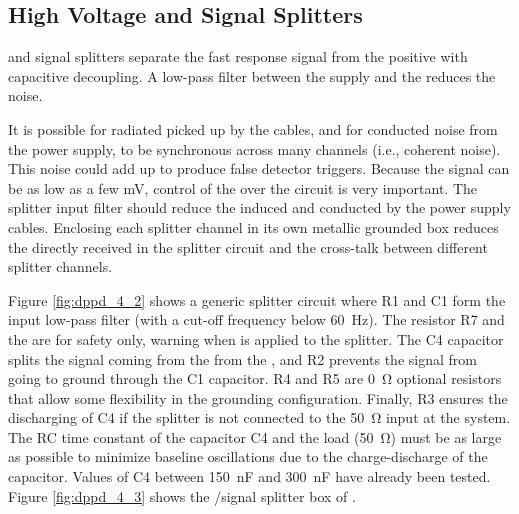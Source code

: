 
\subsection{High Voltage and Signal Splitters}
\label{sec:fddp-pd-4.2}

 and signal splitters 
separate the fast  response signal from the positive  with capacitive decoupling. 
A low-pass filter between the  supply and the  reduces the noise.

It is possible for radiated  picked up by the cables, and for conducted noise from the  power supply, to be synchronous across many  channels (i.e., coherent noise). This noise could add up to produce false detector triggers. Because the  signal can be as low as a few \si{mV},
control of the  over the circuit is very important. The splitter  input filter should reduce the  induced and conducted by the power supply cables. Enclosing each splitter channel in its own metallic grounded box reduces the  directly received in the splitter circuit and 
the cross-talk between different splitter channels.

Figure \ref{fig:dppd_4_2} shows a generic splitter circuit where R1 and C1 form the  input low-pass filter (with a cut-off frequency below \SI{60}{Hz}). The resistor R7 and the   are for safety only, warning when  is applied to the splitter. The C4 capacitor splits the signal coming from the  from the , and R2 prevents the  signal from going to ground through the C1 capacitor. R4 and R5 are \SI{0}{\ohm} optional resistors that allow some flexibility in the grounding configuration. Finally, R3 ensures the discharging of C4 if the splitter is not connected to the \SI{50}{\ohm} input at the  system. The RC time constant of the capacitor C4 and the load (\SI{50}{\ohm}) must be as large as possible to minimize baseline oscillations due to the charge-discharge of the capacitor. Values of C4 between \SI{150}{nF} and \SI{300}{nF} have already been tested. Figure \ref{fig:dppd_4_3} shows the /signal splitter box of .

